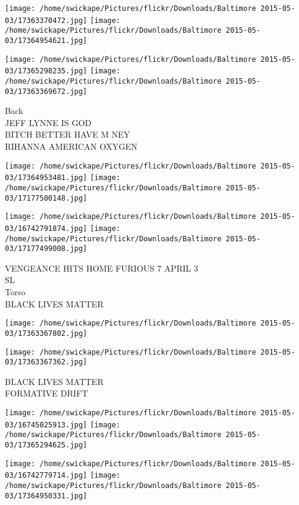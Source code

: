 \documentclass[10pt,letterpaper]{article}
\begin{document}
\texttt{[image: /home/swickape/Pictures/flickr/Downloads/Baltimore 2015-05-03/17363370472.jpg]}
\texttt{[image: /home/swickape/Pictures/flickr/Downloads/Baltimore 2015-05-03/17364954621.jpg]}

\texttt{[image: /home/swickape/Pictures/flickr/Downloads/Baltimore 2015-05-03/17365298235.jpg]}
\texttt{[image: /home/swickape/Pictures/flickr/Downloads/Baltimore 2015-05-03/17363369672.jpg]}

Back\\
JEFF LYNNE IS GOD\\
BITCH BETTER HAVE M NEY\\
RIHANNA AMERICAN OXYGEN\\
\pagebreak

\texttt{[image: /home/swickape/Pictures/flickr/Downloads/Baltimore 2015-05-03/17364953481.jpg]}
\texttt{[image: /home/swickape/Pictures/flickr/Downloads/Baltimore 2015-05-03/17177500148.jpg]}

\texttt{[image: /home/swickape/Pictures/flickr/Downloads/Baltimore 2015-05-03/16742791874.jpg]}
\texttt{[image: /home/swickape/Pictures/flickr/Downloads/Baltimore 2015-05-03/17177499008.jpg]}

VENGEANCE HITS HOME FURIOUS 7 APRIL 3\\
SL\\
Torso\\
BLACK LIVES MATTER\\
\pagebreak

\texttt{[image: /home/swickape/Pictures/flickr/Downloads/Baltimore 2015-05-03/17363367802.jpg]}

\vspace{0.25in}
\texttt{[image: /home/swickape/Pictures/flickr/Downloads/Baltimore 2015-05-03/17363367362.jpg]}

BLACK LIVES MATTER\\
FORMATIVE DRIFT\\
\pagebreak

\texttt{[image: /home/swickape/Pictures/flickr/Downloads/Baltimore 2015-05-03/16745025913.jpg]}
\texttt{[image: /home/swickape/Pictures/flickr/Downloads/Baltimore 2015-05-03/17365294625.jpg]}

\texttt{[image: /home/swickape/Pictures/flickr/Downloads/Baltimore 2015-05-03/16742779714.jpg]}
\texttt{[image: /home/swickape/Pictures/flickr/Downloads/Baltimore 2015-05-03/17364950331.jpg]}
\end{document}
